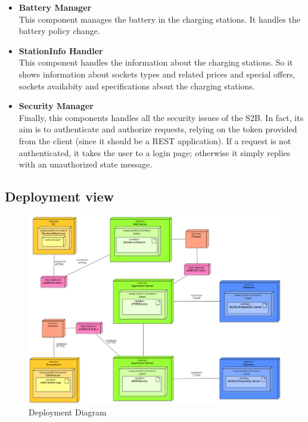 \begin{itemize}
    \item \textbf{Battery Manager}\\This component manages the battery in the charging stations. It handles the battery policy change.
    \item \textbf{StationInfo Handler}\\This component handles the information about the charging stations. So it shows information about sockets types and related prices and special offers, sockets availabity and specifications about the charging stations.
 
    \item \textbf{Security Manager}\\Finally, this components handles all the security issues of the S2B. In fact, its aim is to authenticate and authorize requests, relying on the token provided from the client (since it should be a REST application). If a request is not authenticated, it takes the user to a login page; otherwise it simply replies with an unauthorized state message.
\end{itemize}






\subsection{Deployment view}

\begin{figure}[H]
    \begin{center}
        \includegraphics[width=\textwidth]{img/DeploymentDiagram.PNG}
        \caption{Deployment Diagram}\label{deployment_diagram}
    \end{center}
\end{figure}

